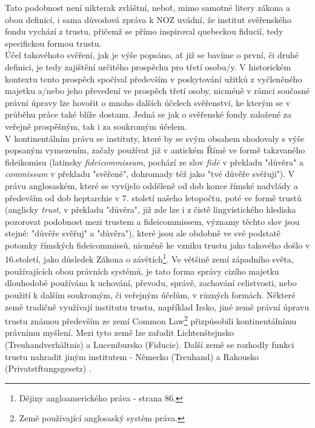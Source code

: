 \documentclass{article}
\begin{document}
Tato podobnost není nikterak zvláštní, neboť, mimo samotné litery zákona a obou definicí, i sama důvodová zpráva k NOZ uvádní, že institut svěřenského fondu vychází z trustu, přičemž se přímo inspiroval quebeckou fiducií, tedy specifickou formou trustu.\\


Účel takovéhoto svěření, jak je výše popsáno, ať již se bavíme o první, či druhé definici, je tedy zajištění určitého prospěchu pro třetí osobu/y. V historickém kontextu tento prospěch spočíval především v poskytování užitků z vyčleněného majetku a/nebo jeho převedení ve prospěch třetí osoby, nicméně v rámci současné právní úpravy lze hovořit o mnoho dalších účelech svěřenství, ke kterým se v průběhu práce také blíže dostanu. Jedná se jak o svěřenské fondy založené za veřejně prospěšným, tak i za soukromým účelem.\\

\indent V kontinentálním právu se instituty, které by se svým obsahem shodovaly s výše popsaným vymezením, začaly používat již v antickém Římě ve formě tak\-zvaného fideikomisu (latinsky \textit{fideicommissum}, pochází ze slov \textit{fīdē} v překladu "důvěra" a \textit{commissum} v překladu "svěřené", dohromady též jako "tvé důvěře svěřuji"). V právu anglosaském, které se vyvíjelo odděleně od dob konce římské nadvlády a především od dob heptarchie v 7. století našeho letopočtu, poté ve formě trustů (anglicky \textit{trust}, v překladu "důvěra", již zde lze i z čistě lingvistického hlediska pozorovat podobnost mezi trustem a fideicommissem, významy těchto slov jsou stejné: "důvěře svěřuj" a "důvěra"), které jsou ale obdobně ve své podstatě potomky římských fideicommissů, nicméně ke vzniku trustu jako takového došlo v 16.století, jako důsledek Zákona o závětích\footnote{Dějiny angloamerického práva - strana 86.}. Ve většině zemí západního světa, používajících obou právních sys\-témů, je tato forma správy cizího majetku dlouhodobě používána k uchování, převodu, správě, zachování celistvosti, nebo použití k dalším soukromým, či veřejným účelům, v různých formách. Některé země tradičně využívají institutu trustu, například Irsko, jiné země právní úpravu trustu známou především ze zemí Common Law\footnote{Země používající anglosaský systém práva.} přizpůsobili kontinentálnímu právnímu myšlení. Mezi tyto země lze zařadit Lichtenštejnsko (Treuhandverhältnis) a Lucembursko (Fiducie). Další země se rozhodly funkci trustu nahradit jiným institutem - Německo (Treuhand) a Rakousko (Privatstftungsgesetz) . \\
\end{document}
